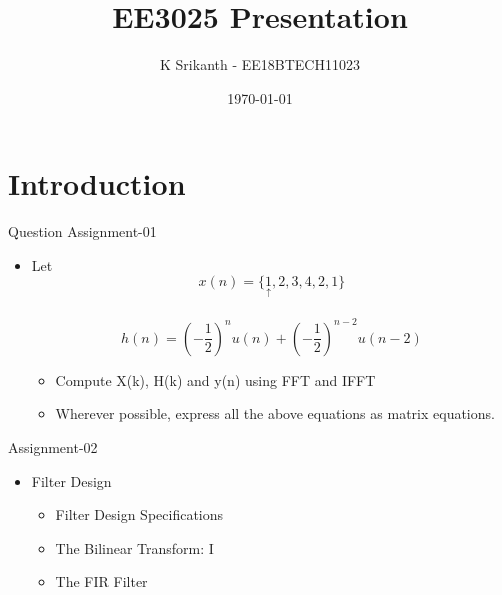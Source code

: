 \documentclass{beamer}
\title[EE3025]{EE3025 Presentation}
\author[K Srikanth]{K Srikanth - EE18BTECH11023}
\institute[IITH]{Indian Institute of Technology Hyderabad}
\date{\today}
\begin{document}
\begin{frame}
  \titlepage
\end{frame}


\section{Introduction}

\begin{frame}{Question}
Assignment-01
\begin{itemize}
        \item Let \[ x(n) = \{\underset{\uparrow}{1},2,3,4,2,1 \} \]\\
            \[ h(n)=\left(-\frac{1}{2}\right)^{n} u(n)+\left(-\frac{1}{2}\right)^{n-2} u(n-2)\]
            \begin{itemize}
                \item  Compute X(k), H(k) and y(n) using FFT and IFFT 
                \item Wherever possible, express all the above equations as matrix equations.
            \end{itemize}
\end{itemize}
Assignment-02
\begin{itemize}
    \item Filter Design
    \begin{itemize}
        \item Filter Design Specifications
        \item The Bilinear Transform: I
        \item The FIR Filter
    \end{itemize}
\end{itemize}
\end{frame}
\end{document}

